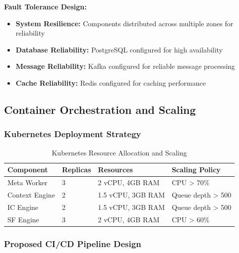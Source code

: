 \textbf{Fault Tolerance Design:}
\begin{itemize}
    \item \textbf{System Resilience:} Components distributed across multiple zones for reliability
    \item \textbf{Database Reliability:} PostgreSQL configured for high availability
    \item \textbf{Message Reliability:} Kafka configured for reliable message processing
    \item \textbf{Cache Reliability:} Redis configured for caching performance
\end{itemize}

\subsection{Container Orchestration and Scaling}

\subsubsection{Kubernetes Deployment Strategy}

\begin{table}[h]
\centering
\begin{tabular}{|l|l|l|l|}
\hline
\textbf{Component} & \textbf{Replicas} & \textbf{Resources} & \textbf{Scaling Policy} \\
\hline
Meta Worker & 3 & 2 vCPU, 4GB RAM & CPU > 70\% \\
Context Engine & 2 & 1.5 vCPU, 3GB RAM & Queue depth > 500 \\
IC Engine & 2 & 1.5 vCPU, 3GB RAM & Queue depth > 500 \\
SF Engine & 3 & 2 vCPU, 4GB RAM & CPU > 60\% \\
\hline
\end{tabular}
\caption{Kubernetes Resource Allocation and Scaling}
\end{table}

\subsubsection{Proposed CI/CD Pipeline Design}

